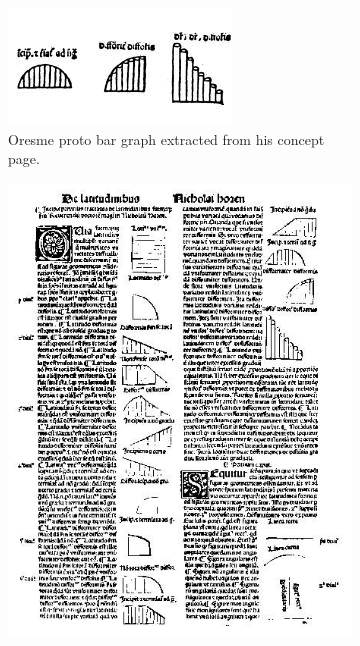 \begin{figure}[!htb]
  \captionsetup[subfigure]{justification=centering}
  \centering
  \begin{subfigure}[t]{0.4\textwidth}
    \includegraphics[width=\textwidth,keepaspectratio]{images/history/oresme-proto.jpg}
    \caption{Oresme proto bar graph extracted from his concept page.}
    \label{fig:oresme-proto}
  \end{subfigure}
  \hfill
  \begin{subfigure}[t]{0.4\textwidth}
    \includegraphics[width=\textwidth,keepaspectratio]{images/history/oresme-page.jpg}

\end{subfigure}
\end{figure}

